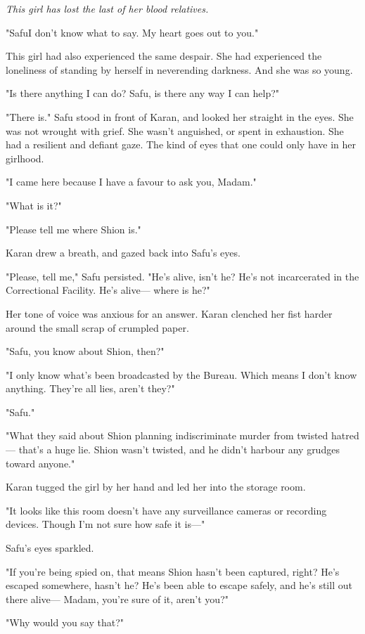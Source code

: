 \emph{This girl has lost the last of her blood relatives.}

"Safu\el I don't know what to say. My heart goes out to you."

This girl had also experienced the same despair. She had experienced the
loneliness of standing by herself in neverending darkness. And she was
so young.

"Is there anything I can do? Safu, is there any way I can help?"

"There is." Safu stood in front of Karan, and looked her straight in the
eyes. She was not wrought with grief. She wasn't anguished, or spent in
exhaustion. She had a resilient and defiant gaze. The kind of eyes that
one could only have in her girlhood.

"I came here because I have a favour to ask you, Madam."

"What is it?"

"Please tell me where Shion is."

Karan drew a breath, and gazed back into Safu's eyes.

"Please, tell me," Safu persisted. "He's alive, isn't he? He's not
incarcerated in the Correctional Facility. He's alive--- where is he?"

Her tone of voice was anxious for an answer. Karan clenched her fist
harder around the small scrap of crumpled paper.

"Safu, you know about Shion, then?"

"I only know what's been broadcasted by the Bureau. Which means I don't
know anything. They're all lies, aren't they?"

"Safu."

"What they said about Shion planning indiscriminate murder from twisted
hatred--- that's a huge lie. Shion wasn't twisted, and he didn't harbour
any grudges toward anyone."

Karan tugged the girl by her hand and led her into the storage room.

"It looks like this room doesn't have any surveillance cameras or
recording devices. Though I'm not sure how safe it is---"

Safu's eyes sparkled.

"If you're being spied on, that means Shion hasn't been captured, right?
He's escaped somewhere, hasn't he? He's been able to escape safely, and
he's still out there alive--- Madam, you're sure of it, aren't you?"

"Why would you say that?"


